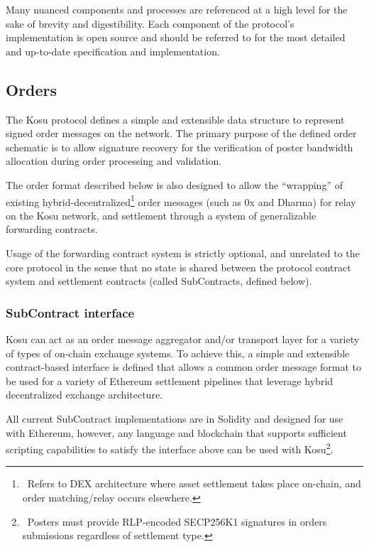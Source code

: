 \documentclass[10pt]{article}
\begin{document}
Many nuanced components and processes are referenced at a high level for the sake of brevity and digestibility. Each component of the protocol’s implementation is open source and should be referred to for the most detailed and up-to-date specification and implementation\cite{paradigm-github}.
\subsection{Orders}\label{orders}

The Kosu protocol defines a simple and extensible data structure to represent signed order messages on the network. The primary purpose of the defined order schematic is to allow signature recovery for the verification of poster bandwidth allocation during order processing and validation.
\medskip

The order format described below is also designed to allow the “wrapping” of existing hybrid-decentralized\footnote{\ Refers to DEX architecture where asset settlement takes place on-chain, and order matching/relay occurs elsewhere.} order messages (such as 0x\cite{0x-wp} and Dharma\cite{dharma-wp}) for relay on the Kosu network, and settlement through a system of generalizable forwarding contracts.
\medskip

Usage of the forwarding contract system is strictly optional, and unrelated to the core protocol in the sense that no state is shared between the protocol contract system and settlement contracts (called SubContracts, defined below).

\subsubsection{SubContract interface}\label{subcontract-interface}

Kosu can act as an order message aggregator and/or transport layer for a variety of types of on-chain exchange systems. To achieve this, a simple and extensible contract-based interface is defined that allows a common order message format to be used for a variety of Ethereum settlement pipelines that leverage hybrid decentralized exchange architecture.
\medskip

All current SubContract implementations are in Solidity and designed for use with Ethereum, however, any language and blockchain that supports sufficient scripting capabilities to satisfy the interface above can be used with Kosu\footnote{\ Posters must provide RLP-encoded SECP256K1 signatures in orders submissions regardless of settlement type.}.
\medskip
\end{document}
